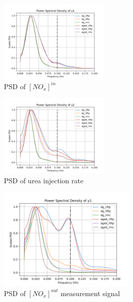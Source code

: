 \begin{multicols}{2}
       \begin{figure}[H]
        \centering
        \includegraphics[width=0.48\textwidth]{./figs/bfr_smth/test_psd/u1.png}
        \caption{PSD of $[NO_x]^{in}$ }
       \end{figure}

       \begin{figure}[H]
        \centering
        \includegraphics[width=0.48\textwidth]{./figs/bfr_smth/test_psd/u2.png}
        \caption{PSD of urea injection rate}
       \end{figure}
\end{multicols}

\begin{figure}[H]
\centering
\includegraphics[width=0.6\textwidth]{./figs/bfr_smth/test_psd/y1.png}
\caption{PSD of $[NO_x]^{out}$ measurement signal}
\end{figure}

